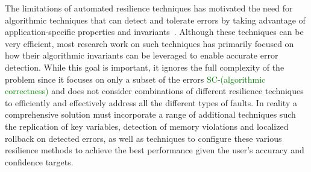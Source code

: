 \documentclass{sig-alternate}
\newcommand{\sui}[1]{%
  \textcolor{green}{SC-#1}
}
\begin{document}
The limitations of automated resilience techniques has motivated the need for algorithmic techniques that can detect and tolerate errors by taking advantage of application-specific properties and invariants~\cite{amg_abft:2012, robustification:2010, abft:1984}.
Although these techniques can be very efficient, most research work on such techniques has primarily focused on how their algorithmic invariants can be leveraged to enable accurate error detection.
While this goal is important, it ignores the full complexity of the problem since it focuses on only a subset of the errors \sui{(algorithmic correctness)} and 
does not consider combinations of different resilience techniques to efficiently and effectively address all the different types of faults.
In reality a comprehensive solution must incorporate a range of additional techniques such the replication of key variables, detection of memory violations and localized rollback on detected errors, as well as techniques to configure these various resilience methods to achieve the best performance given the user's accuracy and confidence targets.
\end{document}
